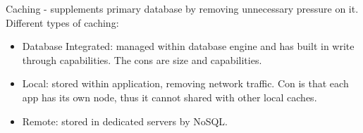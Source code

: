 \documentclass[11pt]{article}
\begin{document}
Caching - supplements primary database by removing unnecessary pressure
on it. Different types of caching:

\begin{itemize}
\item
  Database Integrated: managed within database engine and has built in
  write through capabilities. The cons are size and capabilities.\\
\item
  Local: stored within application, removing network traffic. Con is
  that each app has its own node, thus it cannot shared with other local
  caches.\\
\item
  Remote: stored in dedicated servers by NoSQL.
\end{itemize}
\end{document}
